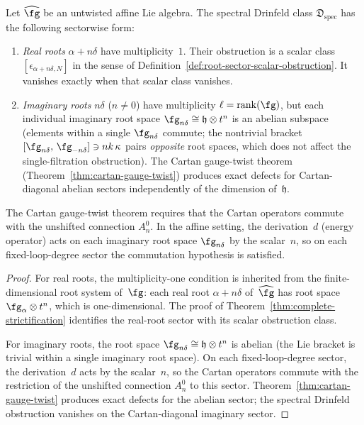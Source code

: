 \begin{theorem}%
\label{thm:affine-strictification-sectors}%
\label{conj:affine-strictification}%
%
Let $\widehat\fg$ be an untwisted affine Lie algebra. The spectral
Drinfeld class $\mathfrak{D}_{\mathrm{spec}}$ has the following
sectorwise form:
\begin{enumerate}
\item \emph{Real roots} $\alpha + n\delta$ have multiplicity~$1$.
 Their obstruction is a scalar class
 $[\epsilon_{\alpha+n\delta,N}]$ in the sense of
 Definition~\textup{\ref{def:root-sector-scalar-obstruction}}.
 It vanishes exactly when that scalar class vanishes.
\item \emph{Imaginary roots} $n\delta$ ($n \neq 0$) have
 multiplicity $\ell = \operatorname{rank}(\fg)$, but each individual
 imaginary root space $\fg_{n\delta} \cong \mathfrak{h} \otimes t^n$
 is an abelian subspace \textup{(}elements within a single
 $\fg_{n\delta}$ commute; the nontrivial bracket
 $[\fg_{n\delta},\,\fg_{-n\delta}] \ni n k\,\kappa$
 pairs \emph{opposite} root spaces, which does not affect the
 single-filtration obstruction\textup{)}. The Cartan gauge-twist
 theorem
 \textup{(}Theorem~\textup{\ref{thm:cartan-gauge-twist}}\textup{)}
 produces exact defects for Cartan-diagonal abelian sectors
 independently of the dimension of~$\mathfrak{h}$.
\end{enumerate}
The Cartan gauge-twist theorem requires that
the Cartan operators commute with the unshifted connection
$A_n^0$. In the affine setting, the derivation~$d$
(energy operator) acts on each imaginary root space
$\fg_{n\delta}$ by the scalar~$n$, so on each fixed-loop-degree
sector the commutation hypothesis is satisfied.
\end{theorem}

\begin{proof}
For real roots, the multiplicity-one condition is inherited from the
finite-dimensional root system of~$\fg$: each real root
$\alpha + n\delta$ of~$\widehat\fg$ has root space
$\fg_\alpha \otimes t^n$, which is one-dimensional. The proof of
Theorem~\ref{thm:complete-strictification} identifies the
real-root sector with its scalar obstruction class.

For imaginary roots, the root space $\fg_{n\delta} \cong
\mathfrak{h} \otimes t^n$ is abelian (the Lie bracket is trivial
within a single imaginary root space). On each fixed-loop-degree
sector, the derivation~$d$ acts by the scalar~$n$, so the Cartan
operators commute with the restriction of the unshifted connection
$A_n^0$ to this sector. Theorem~\ref{thm:cartan-gauge-twist} produces
exact defects for the abelian sector; the spectral Drinfeld
obstruction vanishes on the Cartan-diagonal imaginary sector.
\end{proof}

